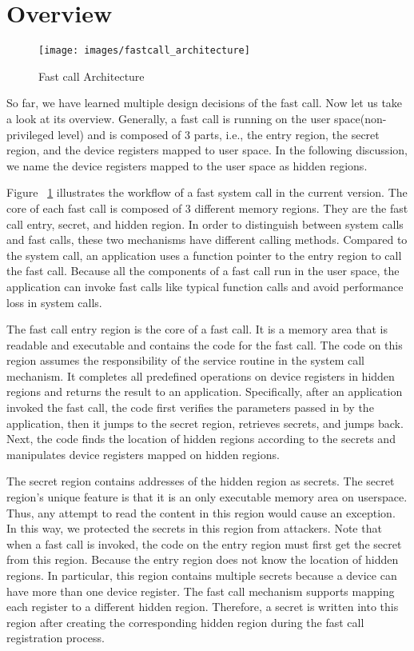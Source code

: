 \section{Overview}
\begin{figure}[tbp]
  \centering
  \texttt{[image: images/fastcall\_architecture]}
  \caption[Fast call Architecture]{Fast call Architecture}
  \label{fig:fastcall_architecture}
\end{figure}



So far, we have learned multiple design decisions of the fast call. 
Now let us take a look at its overview. Generally, 
a fast call is running on the user space(non-privileged level) and is 
composed of 3 parts, i.e., the entry region, the secret region, and the 
device registers mapped to user space. 	In the following discussion, 
we name the device registers mapped to the user space as hidden regions.

Figure ~\ref{fig:fastcall_architecture} illustrates the 
workflow of a fast system call in the current 
version. The core of each fast call is composed of 3 different 
memory regions. They are the fast call entry, secret, and hidden region. 
In order to distinguish between system calls and fast calls, these two 
mechanisms have different calling methods. Compared to the system call, 
an application uses a function pointer to the entry region to call the fast call. Because all 
the components of a fast call run in the user space, the application can 
invoke fast calls like typical function calls and avoid performance 
loss in system calls.

The fast call entry region is the core of a fast call. It is a memory area that is readable and 
executable and contains the code for the fast call. The code on this region assumes the responsibility 
of the service routine in the system call mechanism. It completes all predefined operations on device 
registers in hidden regions and returns the result to an application. Specifically, after an application 
invoked the fast call, the code first verifies the parameters passed in by the application, then it jumps 
to the secret region, retrieves secrets, and jumps back.  Next, the code finds the location of hidden 
regions according to the secrets and manipulates device registers mapped on hidden regions. 

The secret region contains addresses of the hidden region as secrets. 
The secret region's unique feature is that it is an only executable memory area on userspace. 
Thus, any attempt to read the content in this region would cause an exception. In this way, 
we protected the secrets in this region from attackers.  Note that when a fast call is invoked, 
the code on the entry region must first get the secret from this region. Because the entry region does 
not know the location of hidden regions.  In particular,  this region contains multiple secrets because
 a device can have more than one device register. The fast call mechanism supports mapping each register 
 to a different hidden region. Therefore, a secret is written into this region after creating the 
 corresponding hidden region during the fast call registration process.

